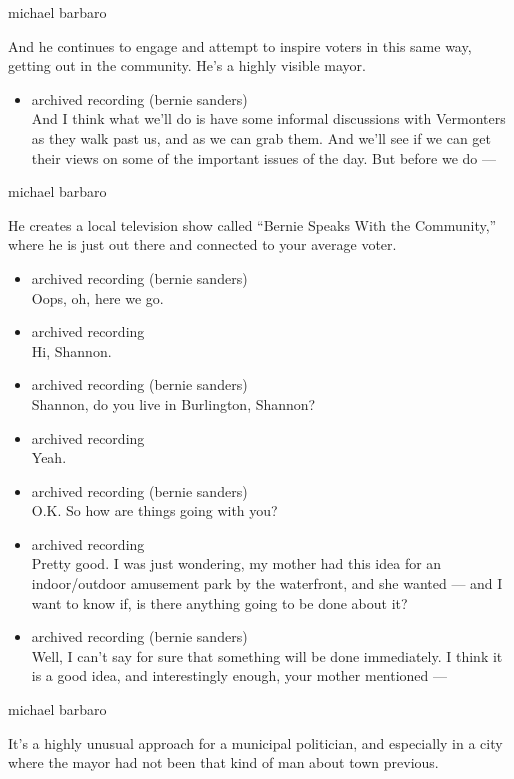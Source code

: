 michael barbaro

And he continues to engage and attempt to inspire voters in this same
way, getting out in the community. He's a highly visible mayor.

\begin{itemize}
\tightlist
\item
  archived recording (bernie sanders)\\
  And I think what we'll do is have some informal discussions with
  Vermonters as they walk past us, and as we can grab them. And we'll
  see if we can get their views on some of the important issues of the
  day. But before we do ---
\end{itemize}

michael barbaro

He creates a local television show called ``Bernie Speaks With the
Community,'' where he is just out there and connected to your average
voter.

\begin{itemize}
\item
  archived recording (bernie sanders)\\
  Oops, oh, here we go.
\item
  archived recording\\
  Hi, Shannon.
\item
  archived recording (bernie sanders)\\
  Shannon, do you live in Burlington, Shannon?
\item
  archived recording\\
  Yeah.
\item
  archived recording (bernie sanders)\\
  O.K. So how are things going with you?
\item
  archived recording\\
  Pretty good. I was just wondering, my mother had this idea for an
  indoor/outdoor amusement park by the waterfront, and she wanted ---
  and I want to know if, is there anything going to be done about it?
\item
  archived recording (bernie sanders)\\
  Well, I can't say for sure that something will be done immediately. I
  think it is a good idea, and interestingly enough, your mother
  mentioned ---
\end{itemize}

michael barbaro

It's a highly unusual approach for a municipal politician, and
especially in a city where the mayor had not been that kind of man about
town previous.


